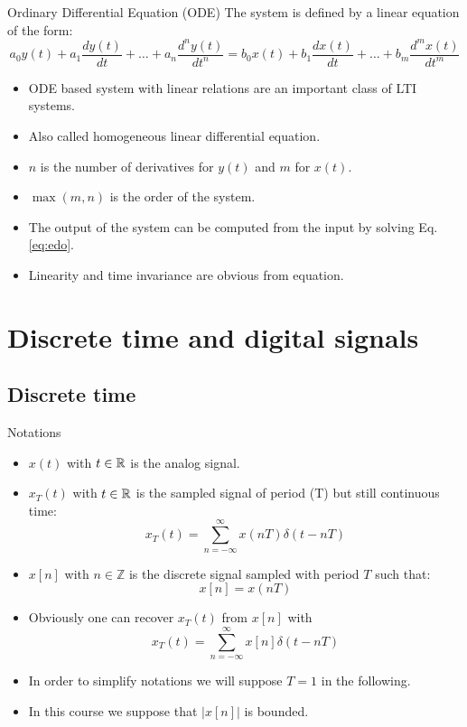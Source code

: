 \begin{block}{Ordinary Differential Equation (ODE)} 
  The system is defined by a linear equation of the form:
  \begin{equation}
    \label{eq:edo}
    a_0y(t)+a_1\frac{dy(t)}{dt}+\dots+a_n\frac{d^ny(t)}{dt^n}=
    b_0x(t)+b_1\frac{dx(t)}{dt} +\dots+b_m\frac{d^mx(t)}{dt^m}
  \end{equation}
  
  \begin{itemize}
  \item ODE based system with linear relations are an important class of LTI systems.
  \item Also called homogeneous linear differential equation.
  \item $n$ is the number of derivatives for $y(t)$ and $m$ for $x(t)$.
  \item $\max(m,n)$ is the order of the system.
  \item The output of the system can be computed from the input by solving Eq.
    \eqref{eq:edo}.
    \item Linearity and time invariance are obvious from equation.
  \end{itemize}
  
  \end{block}


\section{Discrete time and digital signals}
\label{sec:def_discrete_signal}

\subsection{Discrete time}

\begin{block}{Notations}
  \begin{itemize}
      \item $x(t)$ with $t\in\mathbb{R}$ is the analog signal.
      \item $x_T(t)$ with $t\in\mathbb{R}$ is the sampled signal of period (T) but still continuous time:
      $$  x_T(t)=\sum_{n=-\infty}^\infty x(nT)\delta(t-nT) $$
      \item $x[n]$ with $n\in\mathbb{Z}$ is the discrete signal sampled with period $T$ such that:
      $$  x[n]= x(nT) $$
      \item Obviously one can recover $x_T(t)$ from $x[n]$ with
      $$  x_T(t)=\sum_{n=-\infty}^\infty x[n]\delta(t-nT) $$
      \item In order to simplify notations we will suppose $T=1$ in the following.
      \item In this course we suppose that $|x[n]|$ is bounded.
  \end{itemize}
\end{block}



